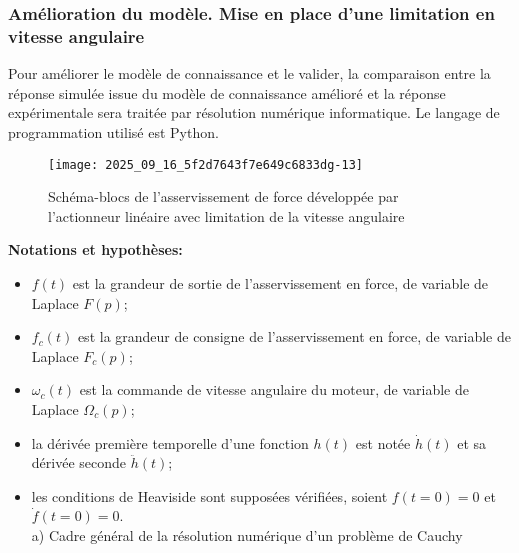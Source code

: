 \ifprof
\begin{corrige}
\end{corrige}
\else
\fi



\subsubsection{ Amélioration du modèle. Mise en place d'une limitation en vitesse angulaire}%
Pour améliorer le modèle de connaissance et le valider, la comparaison entre la réponse simulée issue du modèle de connaissance amélioré et la réponse expérimentale sera traitée par résolution numérique informatique. Le langage de programmation utilisé est Python.



\begin{figure}[!h]
\centering
\texttt{[image: 2025\_09\_16\_5f2d7643f7e649c6833dg-13]}
\caption{\label{ccs_mp_2023_fig_18}  Schéma-blocs de l'asservissement de force développée par l'actionneur linéaire avec limitation de la vitesse angulaire}
\end{figure}



\textbf{Notations et hypothèses:}

\begin{itemize}
  \item $f(t)$ est la grandeur de sortie de l'asservissement en force, de variable de Laplace $F(p)$;
  \item $f_{c}(t)$ est la grandeur de consigne de l'asservissement en force, de variable de Laplace $F_{c}(p)$;
  \item $\omega_{c}(t)$ est la commande de vitesse angulaire du moteur, de variable de Laplace $\Omega_{c}(p)$;
  \item la dérivée première temporelle d'une fonction $h(t)$ est notée $\dot{h}(t)$ et sa dérivée seconde $\ddot{h}(t)$;
  \item les conditions de Heaviside sont supposées vérifiées, soient $f(t=0)=0$ et $\dot{f}(t=0)=0$.\\
a) Cadre général de la résolution numérique d'un problème de Cauchy
\end{itemize}

